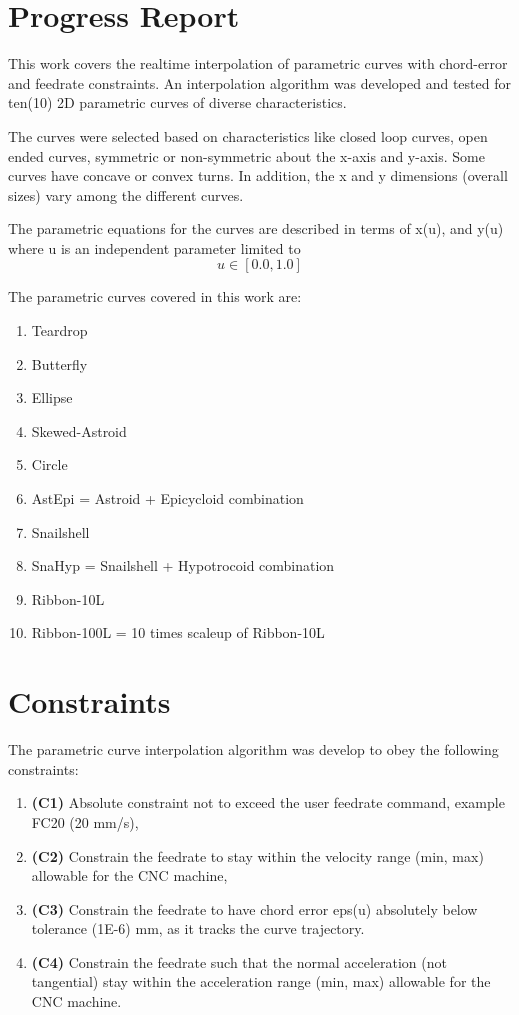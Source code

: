 \pagebreak
\section{Progress Report}

This work covers the realtime interpolation of parametric curves with chord-error and feedrate constraints. An interpolation algorithm was developed and tested for ten(10) 2D parametric curves of diverse characteristics.    
\vspace*{1\baselineskip}

The curves were selected based on characteristics like closed loop curves, open ended curves, symmetric or non-symmetric about the x-axis and y-axis. Some curves have concave or convex turns. In addition, the x and y dimensions (overall sizes) vary among the different curves.
\vspace*{1\baselineskip}

The parametric equations for the curves are described in terms of x(u), and y(u) where u is an independent parameter limited to
\begin{equation}
	u  \in  [0.0, 1.0] \nonumber
\end{equation}

The parametric curves covered in this work are:
\begin{enumerate}
	\item Teardrop
	\item Butterfly
	\item Ellipse
	\item Skewed-Astroid
	\item Circle
	\item AstEpi = Astroid + Epicycloid combination
	\item Snailshell
	\item SnaHyp = Snailshell + Hypotrocoid combination
	\item Ribbon-10L
	\item Ribbon-100L = 10 times scaleup of Ribbon-10L
\end{enumerate}

\section{Constraints}

The parametric curve interpolation algorithm was develop to obey the following constraints:
\begin{enumerate}
\item \textbf{(C1)} Absolute constraint not to exceed the user feedrate command, example FC20 (20 mm/s),
\item \textbf{(C2)} Constrain the feedrate to stay within the velocity range (min, max) allowable for the CNC machine, 
\item \textbf{(C3)} Constrain the feedrate to have chord error eps(u) absolutely below tolerance (1E-6) mm, as it tracks the curve trajectory.
\item \textbf{(C4)} Constrain the feedrate such that the normal acceleration (not tangential) stay within the acceleration range (min, max) allowable for the CNC machine.
\end{enumerate}

